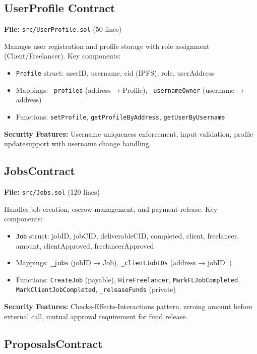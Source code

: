 \subsection{UserProfile Contract}

\textbf{File:} \texttt{src/UserProfile.sol} (50 lines)

Manages user registration and profile storage with role assignment (Client/Freelancer). Key components:
\begin{itemize}
    \item \texttt{Profile} struct: userID, username, cid (IPFS), role, userAddress
    \item Mappings: \texttt{\_profiles} (address → Profile), \texttt{\_usernameOwner} (username → address)
    \item Functions: \texttt{setProfile}, \texttt{getProfileByAddress}, \texttt{getUserByUsername}
\end{itemize}

\textbf{Security Features:} Username uniqueness enforcement, input validation, profile updatesupport with username change handling.

\subsection{JobsContract}

\textbf{File:} \texttt{src/Jobs.sol} (120 lines)

Handles job creation, escrow management, and payment release. Key components:
\begin{itemize}
    \item \texttt{Job} struct: jobID, jobCID, deliverableCID, completed, client, freelancer, amount, clientApproved, freelancerApproved
    \item Mappings: \texttt{\_jobs} (jobID → Job), \texttt{\_clientJobIDs} (address → jobID[])
    \item Functions: \texttt{CreateJob} (payable), \texttt{HireFreelancer}, \texttt{MarkFLJobCompleted}, \texttt{MarkClientJobCompleted}, \texttt{\_releaseFunds} (private)
\end{itemize}

\textbf{Security Features:} Checks-Effects-Interactions pattern, zeroing amount before external call, mutual approval requirement for fund release.

\subsection{ProposalsContract}

